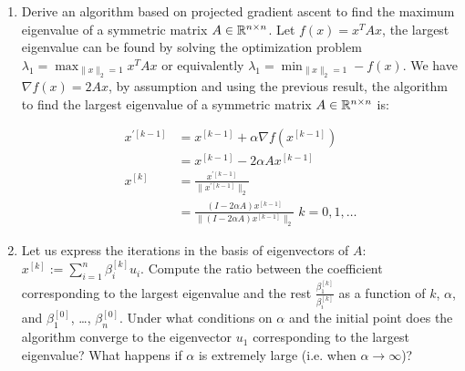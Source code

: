 \documentclass[12pt,twoside]{article}
\begin{document}
\begin{enumerate}
\begin{enumerate}
\item Derive an algorithm based on projected gradient ascent to find the maximum eigenvalue of a symmetric matrix $A\in \mathbb{R}^{n \times n}$.
Let $f(x) = x^T A x$, the largest eigenvalue can be found by solving the optimization problem $\lambda_1= \max _{\|x\|_2=1} x^T A x$ or equivalently $\lambda_1 = \min_{\|x\|_2=1}  - f(x)$.
We have $\nabla{f(x)} = 2 A x$, by assumption and using the previous result, the algorithm to find the largest eigenvalue of a symmetric matrix $A\in \mathbb{R}^{n \times n}$ is:

\begin{align*}
	x^{'[k-1]}	&= x^{[k-1]} + \alpha \nabla{f(x^{[k-1]} )} \\
			&= x^{[k-1]} -2 \alpha A x^{[k-1]} \\
	x^{[k]}	&= \frac{x^{'[k-1]}}{\|x^{'[k-1]}\|_2} \\
			&= \frac{(I - 2 \alpha A) x^{[k-1]}}{ \| (I - 2 \alpha A) x^{[k-1]} \|_2} \; k=0,1, \ldots
\end{align*}


\item Let us express the iterations in the basis of eigenvectors of $A$: $x^{[k]} := \sum_{i=1}^{n}\beta_i^{[k]} u_i$. Compute the ratio between the coefficient corresponding to the largest eigenvalue and the rest $\frac{\beta_1^{[k]}}{\beta_i^{[k]}}$ as a function of $k$, $\alpha$, and $\beta_1^{[0]}$, \ldots, $\beta_n^{[0]}$. Under what conditions on $\alpha$ and the initial point does the algorithm converge to the eigenvector $u_1$ corresponding to the largest eigenvalue? What happens if $\alpha$ is extremely large (i.e. when $\alpha \rightarrow \infty$)?


\end{enumerate}
\end{enumerate}
\end{document}
